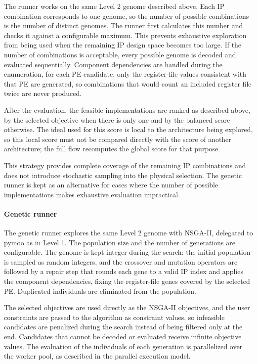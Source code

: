 The runner works on the same Level 2 genome described above. Each IP
combination corresponds to one genome, so the number of possible
combinations is the number of distinct genomes. The runner first
calculates this number and checks it against a configurable maximum.
This prevents exhaustive exploration from being used when the
remaining IP design space becomes too large. If the number of
combinations is acceptable, every possible genome is decoded and
evaluated sequentially. Component dependencies are handled during the
enumeration, for each PE candidate, only the register-file values
consistent with that PE are generated, so combinations that would
count an included register file twice are never produced.

After the evaluation, the feasible implementations are ranked as
described above, by the selected objective when there is only one and
by the balanced score otherwise. The ideal used for this score is
local to the architecture being explored, so this local score must
not be compared directly with the score of another architecture; the
full flow recomputes the global score for that purpose.

This strategy provides complete coverage of the remaining IP
combinations and does not introduce stochastic sampling into the
physical selection. The genetic runner is kept as an alternative for
cases where the number of possible implementations makes exhaustive
evaluation impractical.

\paragraph{Genetic runner}
The genetic runner explores the same Level 2 genome with NSGA-II,
delegated to pymoo as in Level 1. The population size and the number
of generations are configurable. The genome is kept integer during the
search: the initial population is sampled as random integers, and the
crossover and mutation operators are followed by a repair step that
rounds each gene to a valid IP index and applies the component
dependencies, fixing the register-file genes covered by the selected
PE. Duplicated individuals are eliminated from the population.

The selected objectives are used directly as the NSGA-II objectives,
and the user constraints are passed to the algorithm as constraint
values, so infeasible candidates are penalized during the search
instead of being filtered only at the end. Candidates that cannot be
decoded or evaluated receive infinite objective values. The evaluation
of the individuals of each generation is parallelized over the worker
pool, as described in the parallel execution model.

